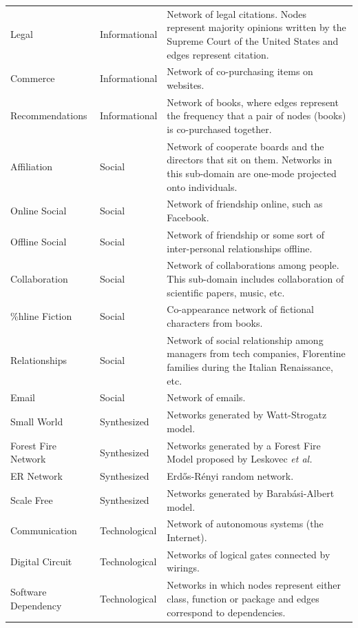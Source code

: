 \documentclass{article}
\begin{document}
\begin{longtable}{| l | l | p{9cm} |}
      Legal &  Informational & Network of legal citations. Nodes represent majority opinions written by the Supreme Court of the United States and edges represent citation.\\ %
      Commerce &  Informational & Network of co-purchasing items on websites.\\  %
      Recommendations &  Informational & Network of books, where edges represent the frequency that a pair of nodes (books) is co-purchased together.\\  %
      Affiliation &  Social & Network of cooperate boards and the directors that sit on them. Networks in this sub-domain are one-mode projected onto individuals.\\  %
      Online Social &  Social & Network of friendship online, such as Facebook.\\  %
      Offline Social &  Social & Network of friendship or some sort of inter-personal relationships offline.\\  %
      Collaboration &  Social & Network of collaborations among people. This sub-domain includes collaboration of scientific papers, music, etc.\\  \%hline
      Fiction &  Social & Co-appearance network of fictional characters from books.\\  %
      Relationships &  Social & Network of social relationship among managers from tech companies, Florentine families during the Italian Renaissance, etc.\\ %
      Email &  Social & Network of emails.\\ %
      Small World &  Synthesized & Networks generated by Watt-Strogatz model.\\  %
      Forest Fire Network &  Synthesized & Networks generated by a Forest Fire Model proposed by Leskovec \textit{et al.} \\  %
      ER Network &  Synthesized & Erd\H{o}s-R\'enyi random network. \\  %
      Scale Free &  Synthesized & Networks generated by Barab\'asi-Albert model.\\  %
      Communication &  Technological & Network of autonomous systems (the Internet).\\  %
      Digital Circuit &  Technological & Networks of logical gates connected by wirings.\\ %
      Software Dependency &  Technological & Networks in which nodes represent either class, function or package and edges correspond to dependencies.\\  %

\end{longtable}
\end{document}

